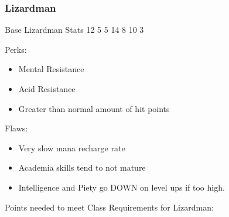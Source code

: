 \documentclass[12pt]{article}
\begin{document}
\subsubsection{Lizardman}\label{lizardman}

Base Lizardman Stats 12 5 5 14 8 10 3

Perks:

\begin{itemize}
\item
  Mental Resistance
\item
  Acid Resistance
\item
  Greater than normal amount of hit points
\end{itemize}

Flaws:

\begin{itemize}
\item
  Very slow mana recharge rate
\item
  Academia skills tend to not mature
\item
  Intelligence and Piety go DOWN on level ups if too high.
\end{itemize}

Points needed to meet Class Requirements for Lizardman:
\end{document}
